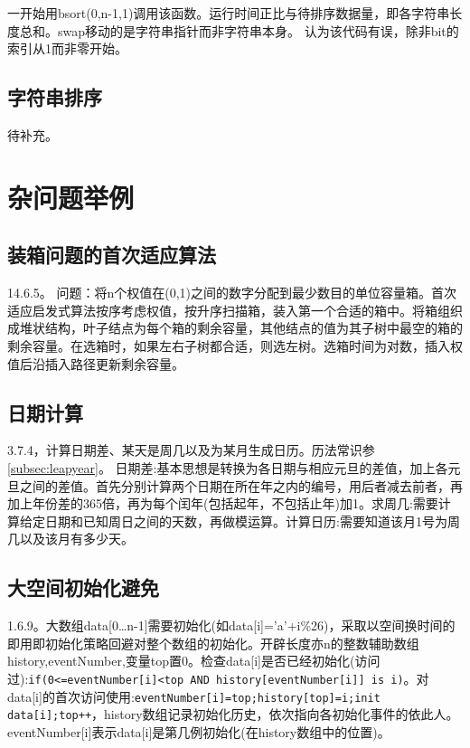 一开始用bsort(0,n-1,1)调用该函数。运行时间正比与待排序数据量，即各字符串长度总和。swap移动的是字符串指针而非字符串本身。 \cite{self}认为该代码有误，除非bit的索引从1而非零开始。

\subsection{字符串排序}
\cite{self}待补充。



\section{杂问题举例}

\subsection{装箱问题的首次适应算法}
\cite{pp}14.6.5。
问题：将n个权值在(0,1)之间的数字分配到最少数目的单位容量箱。首次适应启发式算法按序考虑权值，按升序扫描箱，装入第一个合适的箱中。将箱组织成堆状结构，叶子结点为每个箱的剩余容量，其他结点的值为其子树中最空的箱的剩余容量。在选箱时，如果左右子树都合适，则选左树。选箱时间为对数，插入权值后沿插入路径更新剩余容量。

\subsection{日期计算}
\cite{pp}3.7.4，计算日期差、某天是周几以及为某月生成日历。历法常识参\ref{subsec:leapyear}。
日期差:基本思想是转换为各日期与相应元旦的差值，加上各元旦之间的差值。首先分别计算两个日期在所在年之内的编号，用后者减去前者，再加上年份差的365倍，再为每个闰年(包括起年，不包括止年)加1。求周几:需要计算给定日期和已知周日之间的天数，再做模运算。计算日历:需要知道该月1号为周几以及该月有多少天。

\subsection{大空间初始化避免}
\cite{pp}1.6.9。大数组data[0\dots n-1]需要初始化(如data[i]='a'+i\%26)，采取以空间换时间的即用即初始化策略回避对整个数组的初始化。开辟长度亦n的整数辅助数组history,eventNumber,变量top置0。检查data[i]是否已经初始化(访问过):\verb|if(0<=eventNumber[i]<top AND history[eventNumber[i]] is i)|。对data[i]的首次访问使用:\verb|eventNumber[i]=top;history[top]=i;init data[i];top++|，history数组记录初始化历史，依次指向各初始化事件的依此人。eventNumber[i]表示data[i]是第几例初始化(在history数组中的位置)。\label{problem:removeInit}

